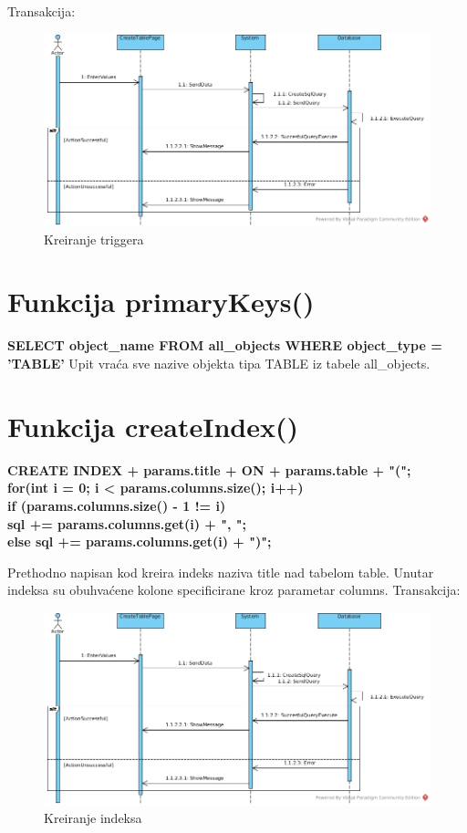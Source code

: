 \documentclass[12pt, a4paper]{report}
\theoremstyle{definition}
\begin{document}
Transakcija:
\begin{figure}[H]
	\begin{center} 
		\includegraphics[height=0.5\textwidth]{CreateTrigger.jpg}
	\end{center}
	\caption{Kreiranje triggera}
\end{figure}

\section{Funkcija primaryKeys()}


\textbf{SELECT object\_name FROM all\_objects WHERE object\_type = 'TABLE'}
Upit vraća sve nazive objekta tipa TABLE iz tabele all\_objects. 
\section{Funkcija createIndex()}
\textbf{CREATE INDEX + params.title + ON + params.table + "(";\\
for(int i = 0; i < params.columns.size(); i++)\\
if (params.columns.size() - 1 != i)\\
sql += params.columns.get(i) + ", ";\\
else sql += params.columns.get(i) + ")";
}

Prethodno napisan kod kreira indeks naziva title nad tabelom table. Unutar indeksa su obuhvaćene kolone specificirane kroz parametar columns. 
Transakcija:
\begin{figure}[H]
	\begin{center} 
		\includegraphics[height=0.5\textwidth]{CreateIndex.jpg}
	\end{center}
	\caption{Kreiranje indeksa}
\end{figure}
\end{document}

